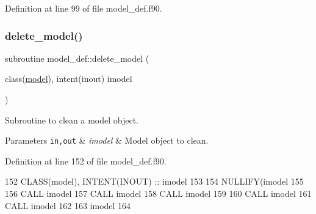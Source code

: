 Definition at line 99 of file model\+\_\+def.\+f90.


\mbox{\label{namespacemodel__def_a10069ccd104ed80ae4ba13bedd1e57e2}} 
\subsubsection{\texorpdfstring{delete\+\_\+model()}{delete\_model()}}
{\footnotesize\ttfamily subroutine model\+\_\+def\+::delete\+\_\+model (\begin{DoxyParamCaption}\item[{class(\hyperlink{structmodel__def_1_1model}{model}), intent(inout)}]{imodel }\end{DoxyParamCaption})\hspace{0.3cm}{\ttfamily [private]}}



Subroutine to clean a model object. 


\begin{DoxyParams}[1]{Parameters}
\mbox{\tt in,out}  & {\em imodel} & Model object to clean. \\
\hline
\end{DoxyParams}


Definition at line 152 of file model\+\_\+def.\+f90.


\begin{DoxyCode}
152     \textcolor{keywordtype}{CLASS}(model), \textcolor{keywordtype}{INTENT(INOUT)} :: imodel
153 
154     \textcolor{keyword}{NULLIFY}(imodel%
155 
156     \textcolor{keyword}{CALL }imodel%
157     \textcolor{keyword}{CALL }imodel%
158     \textcolor{keyword}{CALL }imodel%
159 
160     \textcolor{keyword}{CALL }imodel%
161     \textcolor{keyword}{CALL }imodel%
162 
163     imodel%
164 
\end{DoxyCode}
\mbox{\label{namespacemodel__def_a0eb49b66f98539511b388dabbf00586c}} 
